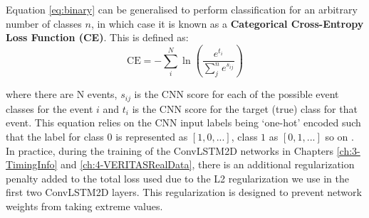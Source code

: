 Equation \ref{eq:binary} can be generalised to perform classification for an arbitrary number of classes $n$, in which case it is known as a \textbf{Categorical Cross-Entropy Loss Function (CE)}. This is defined \cite{Keras} as:
\begin{equation}
    \textrm{CE}=-\sum_i^N \ln \left( \frac{e^{t_{i}}}{\sum_j^n e^{s_{ij}}} \right)
\end{equation}

where there are N events, $s_{ij}$  is the CNN score for each of the possible event classes for the event $i$ and $t_{i}$ is the CNN score for the target (true) class for that event. This equation relies on the CNN input labels being `one-hot' encoded such that the label for class $0$ is represented as $[1,0,...]$, class $1$ as $[0,1,...]$ so on \cite{fb}. In practice, during the training of the ConvLSTM2D networks in Chapters \ref{ch:3-TimingInfo} and \ref{ch:4-VERITASRealData}, there is an additional regularization penalty added to the total loss used due to the L2 regularization we use in the first two ConvLSTM2D layers. This regularization is designed to prevent network weights from taking extreme values.

\begin{table}[ht]
    \centering
    \caption{Definitions of Event Classifications for binary classification, taken from \cite{fawcett}.}
    \label{table:FPR}
\end{table}

